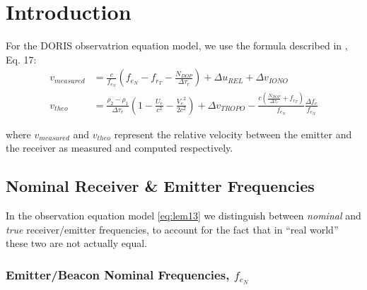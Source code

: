 \section{Introduction}
\label{sec:doris-introduction}

For the DORIS observatrion equation model, we use the formula described in 
\cite{lemoine-2016}, Eq. 17:
\begin{subequations} \label{eq:lem13}
    \begin{align}
        v_{measured} & = \frac{c}{f_{e_N}} (f_{e_N} - f_{r_T} -
          \frac{N_{DOP}}{\Delta\tau_r}) + \Delta u_{REL} + 
          \Delta v_{IONO} \label{eq:lem13a} \\
        v_{theo} &= \frac{\rho_2 - \rho_1}{\Delta\tau_r} 
          (1- \frac{U_e}{c^2} - \frac{{V_e}^2}{2 c^2}) + 
          \Delta v_{TROPO} - \frac{c(\frac{N_{DOP}}{\Delta\tau_r} + 
          f_{r_T})}{f_{e_N}} \frac{\Delta f_e}{f_{e_N}} \label{eq:lem13b}
    \end{align}
\end{subequations}

where $v_{measured}$ and $v_{theo}$ represent the relative velocity between  
the emitter and the receiver as measured and computed respectively.

\subsection{Nominal Receiver \& Emitter Frequencies}
\label{ssec:nominal-frequencies}
In the observation equation model \ref{eq:lem13} we distinguish between 
\emph{nominal} and \emph{true} receiver/emitter frequencies, to account for 
the fact that in ``real world'' these two are not actually equal.

\subsubsection{Emitter/Beacon Nominal Frequencies, $f_{e_N}$}
\label{sssec:beacon-nominal-frequencies}


